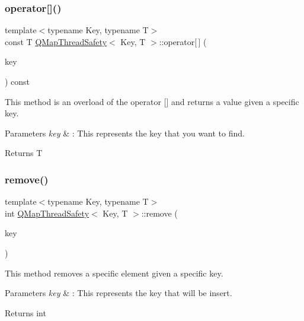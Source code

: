 \subsubsection{\texorpdfstring{operator[]()}{operator[]()}\hspace{0.1cm}{\footnotesize\ttfamily [2/2]}}
{\footnotesize\ttfamily template$<$typename Key, typename T$>$ \\
const T \hyperlink{class_q_map_thread_safety}{Q\+Map\+Thread\+Safety}$<$ Key, T $>$\+::operator\mbox{[}$\,$\mbox{]} (\begin{DoxyParamCaption}\item[{const Key \&}]{key }\end{DoxyParamCaption}) const\hspace{0.3cm}{\ttfamily [inline]}}



This method is an overload of the operator \mbox{[}\mbox{]} and returns a value given a specific key. 


\begin{DoxyParams}{Parameters}
{\em key} & \+: This represents the key that you want to find. \\
\hline
\end{DoxyParams}
\begin{DoxyReturn}{Returns}
T 
\end{DoxyReturn}
\mbox{\label{class_q_map_thread_safety_a91e703ad03572023876108c2b7bc3540}} 
\subsubsection{\texorpdfstring{remove()}{remove()}}
{\footnotesize\ttfamily template$<$typename Key, typename T$>$ \\
int \hyperlink{class_q_map_thread_safety}{Q\+Map\+Thread\+Safety}$<$ Key, T $>$\+::remove (\begin{DoxyParamCaption}\item[{const Key \&}]{key }\end{DoxyParamCaption})\hspace{0.3cm}{\ttfamily [inline]}}



This method removes a specific element given a specific key. 


\begin{DoxyParams}{Parameters}
{\em key} & \+: This represents the key that will be insert. \\
\hline
\end{DoxyParams}
\begin{DoxyReturn}{Returns}
int 
\end{DoxyReturn}
\mbox{\label{class_q_map_thread_safety_a0331b4ea9616aa81d1ede4066113c35b}} 
